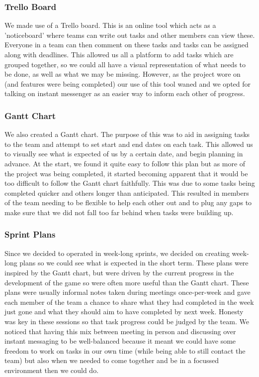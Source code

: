 \documentclass[12pt]{article}
\begin{document}
\subsubsection{Trello Board}
We made use of a Trello board. This is an online tool which acts as a 'noticeboard' where teams can write out tasks and other members can view these. Everyone in a team can then comment on these tasks and tasks can be assigned along with deadlines. This allowed us all a platform to add tasks which are grouped together, so we could all have a visual representation of what needs to be done, as well as what we may be missing. However, as the project wore on (and features were being completed) our use of this tool waned and we opted for talking on instant messenger as an easier way to inform each other of progress.
\subsubsection{Gantt Chart}
We also created a Gantt chart. The purpose of this was to aid in assigning tasks to the team and attempt to set start and end dates on each task. This allowed us to visually see what is expected of us by a certain date, and begin planning in advance. At the start, we found it quite easy to follow this plan but as more of the project was being completed, it started becoming apparent that it would be too difficult to follow the Gantt chart faithfully. This was due to some tasks being completed quicker and others longer than anticipated. This resulted in members of the team needing to be flexible to help each other out and to plug any gaps to make sure that we did not fall too far behind when tasks were building up.
\subsubsection{Sprint Plans}
Since we decided to operated in week-long sprints, we decided on creating week-long plans so we could see what is expected in the short term. These plans were inspired by the Gantt chart, but were driven by the current progress in the development of the game so were often more useful than the Gantt chart. These plans were usually informal notes taken during meetings once-per-week and gave each member of the team a chance to share what they had completed in the week just gone and what they should aim to have completed by next week. Honesty was key in these sessions so that task progress could be judged by the team. We noticed that having this mix between meeting in person and discussing over instant messaging to be well-balanced because it meant we could have some freedom to work on tasks in our own time (while being able to still contact the team) but also when we needed to come together and be in a focussed environment then we could do.
\end{document}
